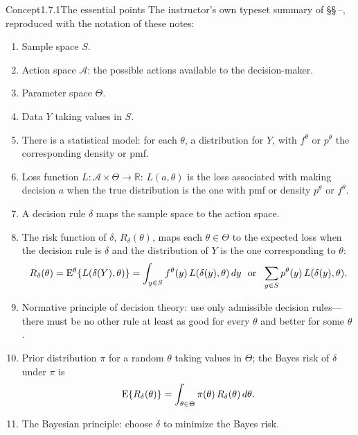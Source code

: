 \documentclass[main.tex]{subfiles}
\begin{document}

\begin{ObjL}{Concept}{1.7.1}{The essential points}
The instructor's own typeset summary of \S\S\,--, reproduced with the
notation of these notes:
\begin{enumerate}[leftmargin=2.2em,itemsep=3pt,topsep=3pt]
  \item Sample space $S$.
  \item Action space $\mathcal{A}$: the possible actions available to the decision-maker.
  \item Parameter space $\Theta$.
  \item Data $Y$ taking values in $S$.
  \item There is a statistical model: for each $\theta$, a distribution for $Y$, with
        $f^{\theta}$ or $p^{\theta}$ the corresponding density or pmf.
  \item Loss function $L:\mathcal{A}\times\Theta\to\mathbb{R}$: $L(a,\theta)$ is the loss
        associated with making decision $a$ when the true distribution is the one with pmf or
        density $p^{\theta}$ or $f^{\theta}$.
  \item A decision rule $\delta$ maps the sample space to the action space.
  \item The risk function of $\delta$, $R_{\delta}(\theta)$, maps each $\theta\in\Theta$ to the
        expected loss when the decision rule is $\delta$ and the distribution of $Y$ is the one
        corresponding to $\theta$:
        \[ R_{\delta}(\theta)=\mathrm{E}^{\theta}\{L(\delta(Y),\theta)\}
           =\int_{y\in S} f^{\theta}(y)\,L(\delta(y),\theta)\,dy
           \ \ \text{or}\ \ \sum_{y\in S} p^{\theta}(y)\,L(\delta(y),\theta). \]
  \item Normative principle of decision theory: use only admissible decision rules---there must
        be no other rule at least as good for every $\theta$ and better for some $\theta$.
  \item Prior distribution $\pi$ for a random $\theta$ taking values in $\Theta$; the Bayes
        risk of $\delta$ under $\pi$ is
        \[ \mathrm{E}\{R_{\delta}(\theta)\}=\int_{\theta\in\Theta}\pi(\theta)\,R_{\delta}(\theta)\,d\theta . \]
  \item The Bayesian principle: choose $\delta$ to minimize the Bayes risk.
\end{enumerate}
\end{ObjL}
\end{document}
